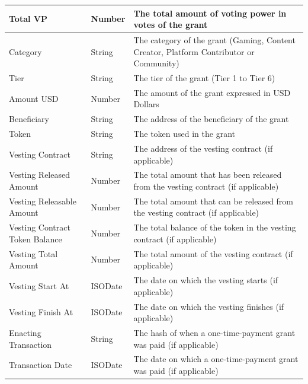 \documentclass[MSE,Master,english]{twbook}%
\begin{document}
\begin{xltabular}{\textwidth}{|l|l|X|}
  Total VP                       & Number  & The total amount of voting power in votes of the grant                                 \\ \hline
  Category                       & String  & The category of the grant (Gaming, Content Creator, Platform Contributor or Community) \\ \hline
  Tier                           & String  & The tier of the grant (Tier 1 to Tier 6)                                               \\ \hline
  Amount USD                     & Number  & The amount of the grant expressed in USD Dollars                                       \\ \hline
  Beneficiary                    & String  & The address of the beneficiary of the grant                                            \\ \hline
  Token                          & String  & The token used in the grant                                                            \\ \hline
  Vesting Contract               & String  & The address of the vesting contract (if applicable)                                    \\ \hline
  Vesting Released Amount        & Number  & The total amount that has been released from the vesting contract (if applicable)      \\ \hline
  Vesting Releasable Amount      & Number  & The total amount that can be released from the vesting contract (if applicable)        \\ \hline
  Vesting Contract Token Balance & Number  & The total balance of the token in the vesting contract (if applicable)                 \\ \hline
  Vesting Total Amount           & Number  & The total amount of the vesting contract (if applicable)                               \\ \hline
  Vesting Start At               & ISODate & The date on which the vesting starts (if applicable)                                   \\ \hline
  Vesting Finish At              & ISODate & The date on which the vesting finishes (if applicable)                                 \\ \hline
  Enacting Transaction           & String  & The hash of when a one-time-payment grant was paid (if applicable)                     \\ \hline
  Transaction Date               & ISODate & The date on which a one-time-payment grant was paid (if applicable)                    \\ \hline

\end{xltabular}
\end{document}
